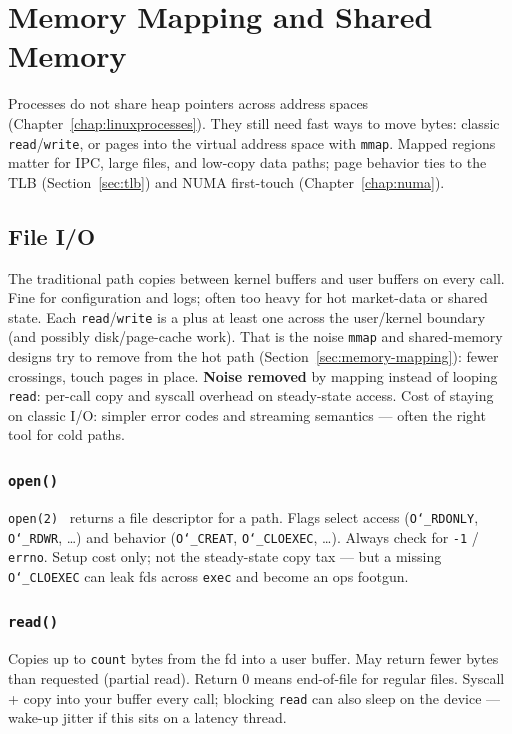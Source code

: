 \chapter{Memory Mapping and Shared Memory}
\label{chap:memorymapping}

Processes do not share heap pointers across address spaces (Chapter~\ref{chap:linuxprocesses}). 
They still need fast ways to move bytes: classic \texttt{read}/\texttt{write}, or 
 pages into the virtual address space with \texttt{mmap}. 
Mapped regions matter for IPC, large files, and low-copy data paths; page behavior ties to the 
TLB (Section~\ref{sec:tlb}) and NUMA first-touch (Chapter~\ref{chap:numa}).

\section{File I/O}
\label{sec:file-io}
The traditional path copies between kernel buffers and user buffers on every call. 
Fine for configuration and logs; often too heavy for hot market-data or shared state.
\newline
Each \texttt{read}/\texttt{write} is a  plus at least one 
 across the user/kernel boundary (and possibly disk/page-cache work). 
That is the noise \texttt{mmap} and shared-memory designs try to remove from the hot path 
(Section~\ref{sec:memory-mapping}): fewer crossings, touch pages in place.
\newline
\textbf{Noise removed} by mapping instead of looping \texttt{read}: per-call copy and syscall 
overhead on steady-state access. Cost of staying on classic I/O: simpler error codes and 
streaming semantics --- often the right tool for cold paths.

\subsection{\texttt{open()}}
\label{subsec:open}
\texttt{open(2)}~\cite{man-open} returns a file descriptor for a path. Flags select access 
(\texttt{O\char`_RDONLY}, \texttt{O\char`_RDWR}, \ldots) and behavior (\texttt{O\char`_CREAT}, 
\texttt{O\char`_CLOEXEC}, \ldots). Always check for \texttt{-1} / \texttt{errno}.
\newline
Setup cost only; not the steady-state copy tax --- but a missing \texttt{O\char`_CLOEXEC} can 
leak fds across \texttt{exec} and become an ops footgun.

\subsection{\texttt{read()}}
\label{subsec:read}
Copies up to \texttt{count} bytes from the fd into a user buffer. May return fewer bytes than 
requested (partial read). Return 0 means end-of-file for regular files.
\newline
Syscall + copy into your buffer every call; blocking \texttt{read} can also sleep on the 
device --- wake-up jitter if this sits on a latency thread.

